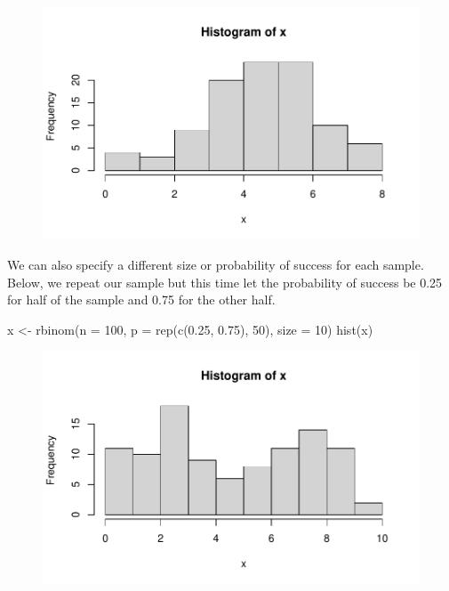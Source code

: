 \documentclass[
  letterpaper,
]{krantz}
\makeatletter
\newenvironment{Shaded}{\begin{snugshade}}{\end{snugshade}}
\newcommand{\AttributeTok}[1]{\textcolor[rgb]{0.40,0.45,0.13}{#1}}
\newcommand{\DecValTok}[1]{\textcolor[rgb]{0.68,0.00,0.00}{#1}}
\newcommand{\FloatTok}[1]{\textcolor[rgb]{0.68,0.00,0.00}{#1}}
\newcommand{\FunctionTok}[1]{\textcolor[rgb]{0.28,0.35,0.67}{#1}}
\newcommand{\NormalTok}[1]{\textcolor[rgb]{0.00,0.23,0.31}{#1}}
\newcommand{\OtherTok}[1]{\textcolor[rgb]{0.00,0.23,0.31}{#1}}
\newenvironment{kframe}{%
\medskip{}
\setlength{\fboxsep}{.8em}
 \def\at@end@of@kframe{}%
 \ifinner\ifhmode%
  \def\at@end@of@kframe{\end{minipage}}%
  \begin{minipage}{\columnwidth}%
 \fi\fi%
 \def\FrameCommand##1{\hskip\@totalleftmargin \hskip-\fboxsep
 \colorbox{shadecolor}{##1}\hskip-\fboxsep
     \hskip-\linewidth \hskip-\@totalleftmargin \hskip\columnwidth}%
 \MakeFramed {\advance\hsize-\width
   \@totalleftmargin\z@ \linewidth\hsize
   \@setminipage}}%
 {\par\unskip\endMakeFramed%
 \at@end@of@kframe}
\renewenvironment{Shaded}{\begin{kframe}}{\end{kframe}}
\makeatother
\begin{document}
\begin{figure}[H]

{\centering \includegraphics[width=1\textwidth,height=\textheight]{book/8_distributions_files/figure-pdf/unnamed-chunk-6-1.pdf}

}

\end{figure}

We can also specify a different size or probability of success for each
sample. Below, we repeat our sample but this time let the probability of
success be 0.25 for half of the sample and 0.75 for the other half.

\begin{Shaded}
\begin{Highlighting}[]
\NormalTok{x }\OtherTok{\textless{}{-}} \FunctionTok{rbinom}\NormalTok{(}\AttributeTok{n =} \DecValTok{100}\NormalTok{, }\AttributeTok{p =} \FunctionTok{rep}\NormalTok{(}\FunctionTok{c}\NormalTok{(}\FloatTok{0.25}\NormalTok{, }\FloatTok{0.75}\NormalTok{), }\DecValTok{50}\NormalTok{), }\AttributeTok{size =} \DecValTok{10}\NormalTok{)}
\FunctionTok{hist}\NormalTok{(x)}
\end{Highlighting}
\end{Shaded}

\begin{figure}[H]

{\centering \includegraphics[width=1\textwidth,height=\textheight]{book/8_distributions_files/figure-pdf/unnamed-chunk-7-1.pdf}

}

\end{figure}
\end{document}
